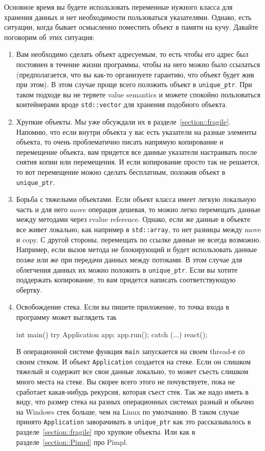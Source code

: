 Основное время вы будете использовать переменные нужного класса для хранения данных и нет необходимости пользоваться указателями.
Однако, есть ситуации, когда бывает осмысленно поместить объект в памяти на кучу.
Давайте поговорим об этих ситуация:
\begin{enumerate}
\item Вам необходимо сделать объект адресуемым, то есть чтобы его адрес был постоянен в течение жизни программы, чтобы на него можно было ссылаться (предполагается, что вы как-то организуете гарантию, что объект будет жив при этом).
В этом случае проще всего положить объект в \texttt{unique\_ptr}.
При таком подходе вы не теряете value semantics и можете спокойно пользоваться контейнерами вроде \texttt{std::vector} для хранения подобного объекта.

\item Хрупкие объекты.
Мы уже обсуждали их в разделе~\ref{section::fragile}.
Напомню, что если внутри объекта у вас есть указатели на разные элементы объекта, то очень проблематично писать напрямую копирование и перемещение объекта, вам придется все данные указатели настраивать после снятия копии или перемещения.
И если копирование просто так не решается, то вот перемещение можно сделать бесплатным, положив объект в \texttt{unique\_ptr}.

\item Борьба с тяжелыми объектами.
Если объект класса имеет легкую локальную часть и для него move операция дешевая, то можно легко перемещать данные между методами через rvalue reference.
Однако, если же данные в объекте все живет локально, как например в \texttt{std::array}, то нет разницы между move и copy.
С другой стороны, перемещать по ссылке данные не всегда возможно.
Например, если вызов метода не блокирующий и будет использовать данные позже или же при передачи данных между потоками.
В этом случае для облегчения данных их можно положить в \texttt{unique\_ptr}.
Если вы хотите поддержать копирование, то вам придется написать соответствующую обертку.

\item Освобождение стека.
Если вы пишете приложение, то точка входа в программу может выглядеть так
\begin{cppcode}
int main() {
  try {
    Application app;
    app.run();
  } catch (...) {
    react();
  }
}
\end{cppcode}
В операционной системе функция \texttt{main} запускается на своем thread-е со своим стеком.
И объект \texttt{Application} создается на стеке.
Если он слишком тяжелый и содержит все свои данные локально, то может съесть слишком много места на стеке.
Вы скорее всего этого не почувствуете, пока не сработает какая-нибудь рекурсия, которая съест стек.
Так же надо иметь в виду, что размер стека на разных операционных системах разный и обычно на Windows стек больше, чем на Linux по умолчанию.
В таком случае принято \texttt{Application} заворачивать в \texttt{unique\_ptr} как это рассказывалось в разделе~\ref{section::fragile} про хрупкие объекты.
Или как в разделе~\ref{section::Pimpl} про Pimpl.
\end{enumerate}

